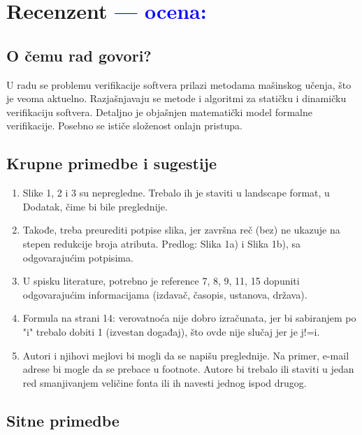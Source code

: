 \documentclass[a4paper]{report}
\newcommand{\odgovor}[1]{\textcolor{blue}{#1}}
\begin{document}
\chapter{Recenzent \odgovor{--- ocena:} }

\section{O čemu rad govori?}

U radu se problemu verifikacije softvera prilazi metodama mašinskog učenja, što je veoma aktuelno.
Razjašnjavaju se metode i algoritmi za statičku i dinamičku verifikaciju softvera.
Detaljno je objašnjen matematički model formalne verifikacije.
Posebno se ističe složenost onlajn pristupa.

\section{Krupne primedbe i sugestije}

\begin{enumerate}
\item Slike 1, 2 i 3 su nepregledne.
Trebalo ih je staviti u landscape format, u Dodatak, čime bi bile preglednije.
\item Takođe, treba preurediti potpise slika,
jer završna reč (bez) ne ukazuje na stepen redukcije broja atributa.
Predlog:
Slika 1a) i Slika 1b), sa odgovarajućim potpisima.
\item U spisku literature, potrebno je reference 7, 8, 9, 11, 15
dopuniti odgovarajućim informacijama (izdavač, časopis, ustanova, država).
\item Formula na strani 14: verovatnoća nije dobro izračunata,
jer bi sabiranjem po "i" trebalo dobiti 1 (izvestan događaj), što ovde nije slučaj jer je j!=i.
\item Autori i njihovi mejlovi bi mogli da se napišu preglednije.
Na primer, e-mail adrese bi mogle da se prebace u footnote.
Autore bi trebalo ili staviti u jedan red smanjivanjem veličine fonta
ili ih navesti jednog ispod drugog.
\end{enumerate}

\section{Sitne primedbe}
\end{document}
